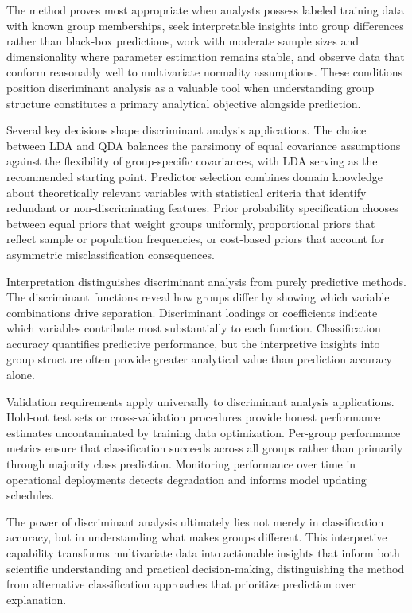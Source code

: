 \documentclass[
]{article}
\begin{document}
The method proves most appropriate when analysts possess labeled
training data with known group memberships, seek interpretable insights
into group differences rather than black-box predictions, work with
moderate sample sizes and dimensionality where parameter estimation
remains stable, and observe data that conform reasonably well to
multivariate normality assumptions. These conditions position
discriminant analysis as a valuable tool when understanding group
structure constitutes a primary analytical objective alongside
prediction.

Several key decisions shape discriminant analysis applications. The
choice between LDA and QDA balances the parsimony of equal covariance
assumptions against the flexibility of group-specific covariances, with
LDA serving as the recommended starting point. Predictor selection
combines domain knowledge about theoretically relevant variables with
statistical criteria that identify redundant or non-discriminating
features. Prior probability specification chooses between equal priors
that weight groups uniformly, proportional priors that reflect sample or
population frequencies, or cost-based priors that account for asymmetric
misclassification consequences.

Interpretation distinguishes discriminant analysis from purely
predictive methods. The discriminant functions reveal how groups differ
by showing which variable combinations drive separation. Discriminant
loadings or coefficients indicate which variables contribute most
substantially to each function. Classification accuracy quantifies
predictive performance, but the interpretive insights into group
structure often provide greater analytical value than prediction
accuracy alone.

Validation requirements apply universally to discriminant analysis
applications. Hold-out test sets or cross-validation procedures provide
honest performance estimates uncontaminated by training data
optimization. Per-group performance metrics ensure that classification
succeeds across all groups rather than primarily through majority class
prediction. Monitoring performance over time in operational deployments
detects degradation and informs model updating schedules.

The power of discriminant analysis ultimately lies not merely in
classification accuracy, but in understanding what makes groups
different. This interpretive capability transforms multivariate data
into actionable insights that inform both scientific understanding and
practical decision-making, distinguishing the method from alternative
classification approaches that prioritize prediction over explanation.
\end{document}
